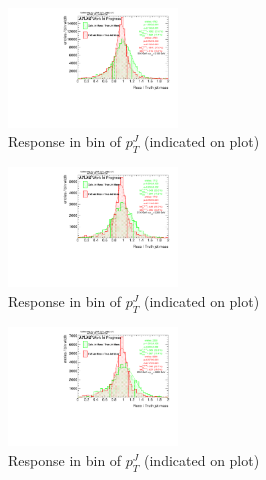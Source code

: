 \begin{figure}

\includegraphics[width=0.4\textwidth]{appendixB/mTAS_W_calibmCal_20:07:01-03-11-2016/8ResponsePTJ_h_JetRatio_mJ10CALO.pdf}
\caption{Response in bin of  $p_{T}^{J}$ (indicated on plot)} 

\end{figure}

\begin{figure}

\includegraphics[width=0.4\textwidth]{appendixB/mTAS_W_calibmCal_20:07:01-03-11-2016/8ResponsePTJ_h_JetRatio_mJ11CALO.pdf}
\caption{Response in bin of  $p_{T}^{J}$ (indicated on plot)} 

\end{figure}

\begin{figure}

\includegraphics[width=0.4\textwidth]{appendixB/mTAS_W_calibmCal_20:07:01-03-11-2016/8ResponsePTJ_h_JetRatio_mJ12CALO.pdf}
\caption{Response in bin of  $p_{T}^{J}$ (indicated on plot)} 

\end{figure}
